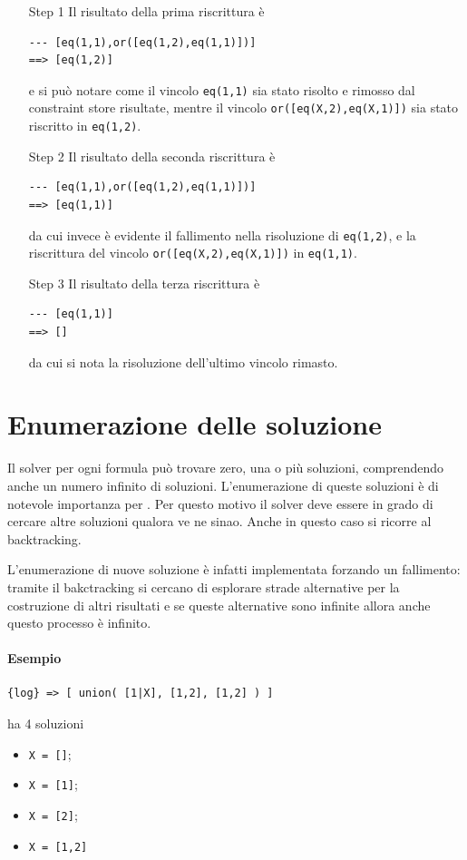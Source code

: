 \documentclass[12pt,a4paper,openright]{book} %
\begin{document}
\begin{itemize}

\item[Step 1] Il risultato della prima riscrittura è
\begin{verbatim}
--- [eq(1,1),or([eq(1,2),eq(1,1)])]
==> [eq(1,2)]
\end{verbatim}
e si può notare come il vincolo \verb|eq(1,1)| sia stato risolto e rimosso dal constraint store risultate, mentre il vincolo \verb|or([eq(X,2),eq(X,1)])| sia stato riscritto in \verb|eq(1,2)|.

\item[Step 2] Il risultato della seconda riscrittura è
\begin{verbatim}
--- [eq(1,1),or([eq(1,2),eq(1,1)])]
==> [eq(1,1)]
\end{verbatim} 
da cui invece è evidente il fallimento nella risoluzione di \verb|eq(1,2)|, e la riscrittura del vincolo \verb|or([eq(X,2),eq(X,1)])| in \verb|eq(1,1)|.

\item[Step 3] Il risultato della terza riscrittura è
\begin{verbatim}
--- [eq(1,1)]
==> []
\end{verbatim}
da cui si nota la risoluzione dell'ultimo vincolo rimasto.

\end{itemize}

\section{Enumerazione delle soluzione}

Il solver per ogni formula può trovare zero, una o più soluzioni, comprendendo anche un numero infinito di soluzioni. L'enumerazione di queste soluzioni è di notevole importanza per \lset{}. Per questo motivo il solver deve essere in grado di cercare altre soluzioni qualora ve ne sinao. Anche in questo caso si ricorre al backtracking.

L'enumerazione di nuove soluzione è infatti implementata forzando un fallimento: tramite il bakctracking si cercano di esplorare strade alternative per la costruzione di altri risultati e se queste alternative sono infinite allora anche questo processo è infinito.

\paragraph{Esempio}
\begin{verbatim}
{log} => [ union( [1|X], [1,2], [1,2] ) ]
\end{verbatim}
ha 4 soluzioni
\begin{itemize}
\item \verb|X = []|;
\item \verb|X = [1]|;
\item \verb|X = [2]|;
\item \verb|X = [1,2]|
\end{itemize}
\end{document}
